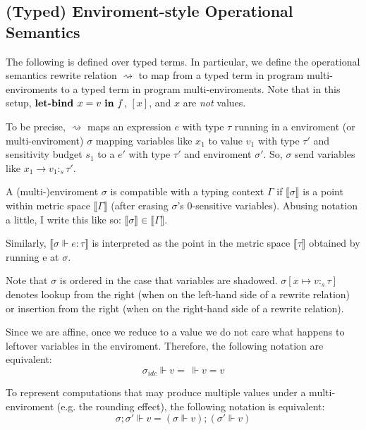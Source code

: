 \subsection{(Typed) Enviroment-style Operational Semantics}
The following is defined over typed terms. In particular, we define the
operational semantics rewrite relation $\rightsquigarrow$ to map from a typed
term in program multi-enviroments to a typed term in program multi-enviroments. Note
that in this setup, $\textbf{let-bind } x = v \ \textbf{in} \ f$, $[x]$, and $x$ are \textit{not}
values.

To be precise, $\rightsquigarrow$ maps an expression $e$ with type $\tau$
running in a enviroment (or multi-enviroment) $\sigma$ mapping variables like
$x_1$ to value $v_1$ with type $\tau'$ and sensitivity budget $s_1$ to a $e'$
with type $\tau'$ and enviroment $\sigma'$. So, $\sigma$ send variables like
$x_1 \to v_1 :_s \tau'$.

A (multi-)enviroment $\sigma$ is compatible with a typing context $\Gamma$ if
$\llbracket \sigma \rrbracket$ is a point within metric space $\llbracket \Gamma
\rrbracket$ (after erasing $\sigma$'s $0$-sensitive variables). Abusing notation
a little, I write this like so: $\llbracket \sigma \rrbracket \in \llbracket
\Gamma \rrbracket$.


Similarly, $\llbracket \sigma \Vdash e : \tau \rrbracket$ is
interpreted as the point in the metric space $\llbracket \tau \rrbracket$
obtained by running e at $\sigma$.

Note that $\sigma$ is ordered in the case that variables are shadowed. $\sigma[x
\mapsto v :_s \tau]$ denotes lookup from the right (when on the left-hand side
of a rewrite relation) or insertion from the right (when on the right-hand side
of a rewrite relation).

Since we are affine, once we reduce to a value we do not care what happens to
leftover variables in the enviroment. Therefore, the following notation are
equivalent:
$$
\sigma_{idc} \Vdash v = \ \Vdash v = v
$$

To represent computations that may produce multiple values under a
multi-enviroment (e.g. the rounding effect), the following notation is
equivalent:
$$
\sigma; \sigma' \Vdash v = (\sigma \Vdash v); (\sigma' \Vdash v)
$$

